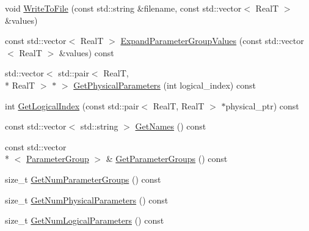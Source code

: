 \begin{DoxyCompactItemize}
\item 
void \hyperlink{class_c_o_n_t_r_a_l_i_g_n_1_1_parameter_manager_a836ef691153cf1c440da8cd3933395ad}{Write\+To\+File} (const std\+::string \&filename, const std\+::vector$<$ Real\+T $>$ \&values)
\item 
const std\+::vector$<$ Real\+T $>$ \hyperlink{class_c_o_n_t_r_a_l_i_g_n_1_1_parameter_manager_a0d879c87e8f22ade271707a3f5d1dd2a}{Expand\+Parameter\+Group\+Values} (const std\+::vector$<$ Real\+T $>$ \&values) const 
\item 
std\+::vector$<$ std\+::pair$<$ Real\+T, \\*
Real\+T $>$ $\ast$ $>$ \hyperlink{class_c_o_n_t_r_a_l_i_g_n_1_1_parameter_manager_ab417ba3f49ef3db98a9c357cde607a79}{Get\+Physical\+Parameters} (int logical\+\_\+index) const 
\item 
int \hyperlink{class_c_o_n_t_r_a_l_i_g_n_1_1_parameter_manager_a46dea3ed20a97d19ff4ddecf1b37d6cd}{Get\+Logical\+Index} (const std\+::pair$<$ Real\+T, Real\+T $>$ $\ast$physical\+\_\+ptr) const 
\item 
const std\+::vector$<$ std\+::string $>$ \hyperlink{class_c_o_n_t_r_a_l_i_g_n_1_1_parameter_manager_a16fcaa7317cd17ee128365d6cee0d966}{Get\+Names} () const 
\item 
const std\+::vector\\*
$<$ \hyperlink{struct_c_o_n_t_r_a_l_i_g_n_1_1_parameter_group}{Parameter\+Group} $>$ \& \hyperlink{class_c_o_n_t_r_a_l_i_g_n_1_1_parameter_manager_a6cfd4bf74ee61548e56d8d6027c74f83}{Get\+Parameter\+Groups} () const 
\item 
size\+\_\+t \hyperlink{class_c_o_n_t_r_a_l_i_g_n_1_1_parameter_manager_a0cec15e02161732c6e6a5a74cd95ff2b}{Get\+Num\+Parameter\+Groups} () const 
\item 
size\+\_\+t \hyperlink{class_c_o_n_t_r_a_l_i_g_n_1_1_parameter_manager_a7ec472071d84c62721664b2f78e97731}{Get\+Num\+Physical\+Parameters} () const 
\item 
size\+\_\+t \hyperlink{class_c_o_n_t_r_a_l_i_g_n_1_1_parameter_manager_ae71a84aa15b18cd85e52a5b4b455e199}{Get\+Num\+Logical\+Parameters} () const 
\end{DoxyCompactItemize}


